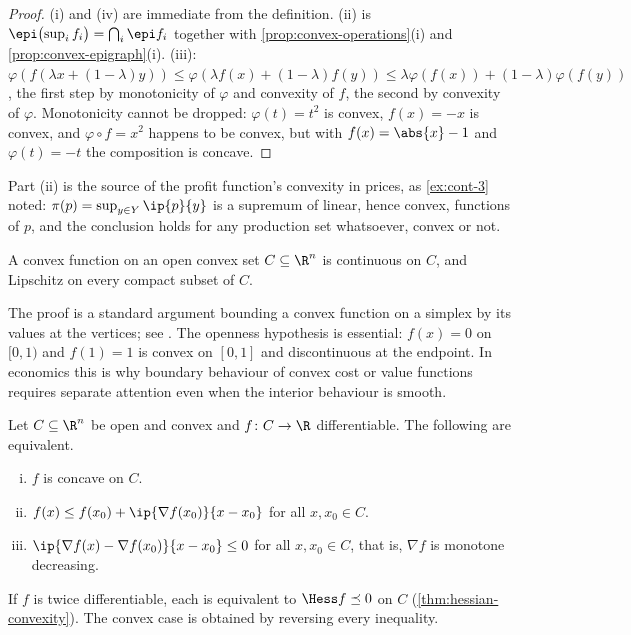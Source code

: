 \begin{proof}
	(i) and (iv) are immediate from the definition. (ii) is
	$\epi\bigl(\sup_if_i\bigr)=\bigcap_i\epi f_i$ together with
	\autoref{prop:convex-operations}(i) and \autoref{prop:convex-epigraph}(i).
	(iii): $\varphi(f(\lambda x+(1-\lambda)y))\leq\varphi(\lambda
		f(x)+(1-\lambda)f(y))\leq\lambda\varphi(f(x))+(1-\lambda)\varphi(f(y))$, the
	first step by monotonicity of $\varphi$ and convexity of $f$, the second by
	convexity of $\varphi$. Monotonicity cannot be dropped: $\varphi(t)=t^2$ is
	convex, $f(x)=-x$ is convex, and $\varphi\circ f=x^2$ happens to be convex, but
	with $f(x)=\abs{x}-1$ and $\varphi(t)=-t$ the composition is concave.
\end{proof}

Part (ii) is the source of the profit function's convexity in prices, as
\autoref{ex:cont-3} noted: $\pi(p)=\sup_{y\in Y}\ip{p}{y}$ is a supremum of
linear, hence convex, functions of $p$, and the conclusion holds for any
production set whatsoever, convex or not.

\begin{proposition}[Continuity]\label{prop:convex-continuous}
	A convex function on an open convex set $C\subseteq\R^n$ is continuous on $C$,
	and Lipschitz on every compact subset of $C$.
\end{proposition}

The proof is a standard argument bounding a convex function on a simplex by its
values at the vertices; see \textcite[Thm.~10.4]{rockafellar1970convex}. The
openness hypothesis is essential: $f(x)=0$ on $[0,1)$ and $f(1)=1$ is convex on
$[0,1]$ and discontinuous at the endpoint. In economics this is why boundary
behaviour of convex cost or value functions requires separate attention even when
the interior behaviour is smooth.

\begin{theorem}\label{thm:concave-gradient}
	Let $C\subseteq\R^n$ be open and convex and $f\colon C\to\R$ differentiable.
	The following are equivalent.
	\begin{enumerate}[(i)]
		\item $f$ is concave on $C$.
		\item $f(x)\leq f(x_0)+\ip{\nabla f(x_0)}{x-x_0}$ for all $x,x_0\in C$.
		\item $\ip{\nabla f(x)-\nabla f(x_0)}{x-x_0}\leq0$ for all $x,x_0\in C$, that
		      is, $\nabla f$ is monotone decreasing.
	\end{enumerate}
	If $f$ is twice differentiable, each is equivalent to $\Hess f\preceq0$ on $C$
	(\autoref{thm:hessian-convexity}). The convex case is obtained by reversing
	every inequality.
\end{theorem}

